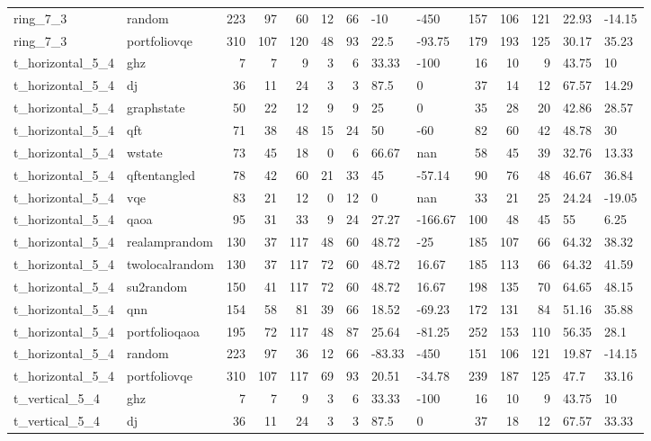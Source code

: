 \begin{longtable}{llrrrrrllrrrll}
ring\_7\_3 & random & 223 & 97 & 60 & 12 & 66 & -10 & -450 & 157 & 106 & 121 & 22.93 & -14.15 \\
ring\_7\_3 & portfoliovqe & 310 & 107 & 120 & 48 & 93 & 22.5 & -93.75 & 179 & 193 & 125 & 30.17 & 35.23 \\
t\_horizontal\_5\_4 & ghz & 7 & 7 & 9 & 3 & 6 & 33.33 & -100 & 16 & 10 & 9 & 43.75 & 10 \\
t\_horizontal\_5\_4 & dj & 36 & 11 & 24 & 3 & 3 & 87.5 & 0 & 37 & 14 & 12 & 67.57 & 14.29 \\
t\_horizontal\_5\_4 & graphstate & 50 & 22 & 12 & 9 & 9 & 25 & 0 & 35 & 28 & 20 & 42.86 & 28.57 \\
t\_horizontal\_5\_4 & qft & 71 & 38 & 48 & 15 & 24 & 50 & -60 & 82 & 60 & 42 & 48.78 & 30 \\
t\_horizontal\_5\_4 & wstate & 73 & 45 & 18 & 0 & 6 & 66.67 & nan & 58 & 45 & 39 & 32.76 & 13.33 \\
t\_horizontal\_5\_4 & qftentangled & 78 & 42 & 60 & 21 & 33 & 45 & -57.14 & 90 & 76 & 48 & 46.67 & 36.84 \\
t\_horizontal\_5\_4 & vqe & 83 & 21 & 12 & 0 & 12 & 0 & nan & 33 & 21 & 25 & 24.24 & -19.05 \\
t\_horizontal\_5\_4 & qaoa & 95 & 31 & 33 & 9 & 24 & 27.27 & -166.67 & 100 & 48 & 45 & 55 & 6.25 \\
t\_horizontal\_5\_4 & realamprandom & 130 & 37 & 117 & 48 & 60 & 48.72 & -25 & 185 & 107 & 66 & 64.32 & 38.32 \\
t\_horizontal\_5\_4 & twolocalrandom & 130 & 37 & 117 & 72 & 60 & 48.72 & 16.67 & 185 & 113 & 66 & 64.32 & 41.59 \\
t\_horizontal\_5\_4 & su2random & 150 & 41 & 117 & 72 & 60 & 48.72 & 16.67 & 198 & 135 & 70 & 64.65 & 48.15 \\
t\_horizontal\_5\_4 & qnn & 154 & 58 & 81 & 39 & 66 & 18.52 & -69.23 & 172 & 131 & 84 & 51.16 & 35.88 \\
t\_horizontal\_5\_4 & portfolioqaoa & 195 & 72 & 117 & 48 & 87 & 25.64 & -81.25 & 252 & 153 & 110 & 56.35 & 28.1 \\
t\_horizontal\_5\_4 & random & 223 & 97 & 36 & 12 & 66 & -83.33 & -450 & 151 & 106 & 121 & 19.87 & -14.15 \\
t\_horizontal\_5\_4 & portfoliovqe & 310 & 107 & 117 & 69 & 93 & 20.51 & -34.78 & 239 & 187 & 125 & 47.7 & 33.16 \\
t\_vertical\_5\_4 & ghz & 7 & 7 & 9 & 3 & 6 & 33.33 & -100 & 16 & 10 & 9 & 43.75 & 10 \\
t\_vertical\_5\_4 & dj & 36 & 11 & 24 & 3 & 3 & 87.5 & 0 & 37 & 18 & 12 & 67.57 & 33.33 \\

\end{longtable}
